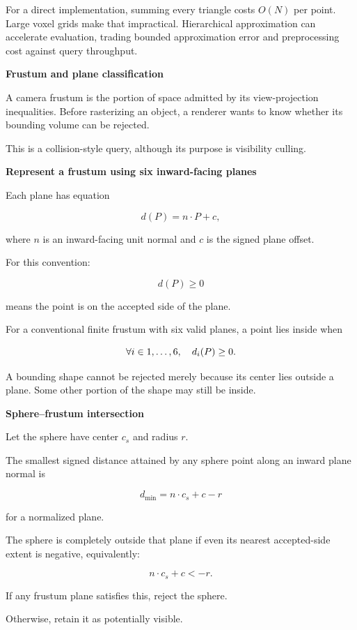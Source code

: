 For a direct implementation, summing every triangle costs \(O(N)\) per point. Large voxel grids make that impractical. Hierarchical approximation can accelerate evaluation, trading bounded approximation error and preprocessing cost against query throughput.

\textbf{Frustum and plane classification}

A camera frustum is the portion of space admitted by its view-projection inequalities. Before rasterizing an object, a renderer wants to know whether its bounding volume can be rejected.

This is a collision-style query, although its purpose is visibility culling.

\textbf{Represent a frustum using six inward-facing planes}

Each plane has equation

\[
d(P)=n\cdot P+c,
\]

where \(n\) is an inward-facing unit normal and \(c\) is the signed plane offset.

For this convention:

\[
d(P)\ge0
\]

means the point is on the accepted side of the plane.

For a conventional finite frustum with six valid planes, a point lies inside when

\[
\forall i\in\\{1,\ldots,6\\},\quad d_i(P)\ge0.
\]

A bounding shape cannot be rejected merely because its center lies outside a plane. Some other portion of the shape may still be inside.

\textbf{Sphere--frustum intersection}

Let the sphere have center \(c_s\) and radius \(r\).

The smallest signed distance attained by any sphere point along an inward plane normal is

\[
d_{\min}=n\cdot c_s+c-r
\]

for a normalized plane.

The sphere is completely outside that plane if even its nearest accepted-side extent is negative, equivalently:

\[
n\cdot c_s+c<-r.
\]

If any frustum plane satisfies this, reject the sphere.

Otherwise, retain it as potentially visible.

